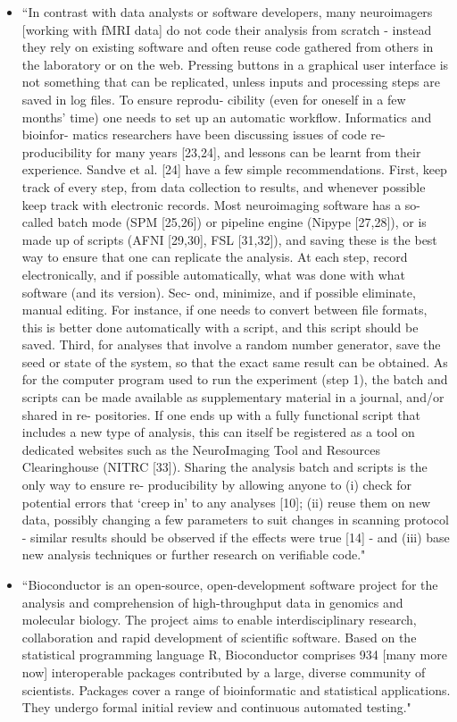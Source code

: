 \documentclass[pdftex,english,11pt,parskip=half]{scrartcl}
\begin{document}
\begin{itemize}
\item ``In contrast with data analysts or software developers, many neuroimagers [working with fMRI data] do not code their analysis from scratch - instead they rely on existing software and often reuse code gathered from others in the laboratory or on the web. Pressing buttons in a graphical user interface is not something that can be replicated, unless inputs and processing steps are saved in log files. To ensure reprodu- cibility (even for oneself in a few months’ time) one needs to set up an automatic workflow. Informatics and bioinfor- matics researchers have been discussing issues of code re- producibility for many years [23,24], and lessons can be learnt from their experience. Sandve et al. [24] have a few simple recommendations. First, keep track of every step, from data collection to results, and whenever possible keep track with electronic records. Most neuroimaging software has a so-called batch mode (SPM [25,26]) or pipeline engine (Nipype [27,28]), or is made up of scripts (AFNI [29,30], FSL [31,32]), and saving these is the best way to ensure that one can replicate the analysis. At each step, record electronically, and if possible automatically, what was done with what software (and its version). Sec- ond, minimize, and if possible eliminate, manual editing. For instance, if one needs to convert between file formats, this is better done automatically with a script, and this script should be saved. Third, for analyses that involve a random number generator, save the seed or state of the system, so that the exact same result can be obtained. As for the computer program used to run the experiment (step 1), the batch and scripts can be made available as supplementary material in a journal, and/or shared in re- positories. If one ends up with a fully functional script that includes a new type of analysis, this can itself be registered as a tool on dedicated websites such as the NeuroImaging Tool and Resources Clearinghouse (NITRC [33]). Sharing the analysis batch and scripts is the only way to ensure re- producibility by allowing anyone to (i) check for potential errors that ‘creep in’ to any analyses [10]; (ii) reuse them on new data, possibly changing a few parameters to suit changes in scanning protocol - similar results should be observed if the effects were true [14] - and (iii) base new analysis techniques or further research on verifiable code." \cite{pernet2015improving}
\item ``Bioconductor is an open-source, open-development software project for the analysis and comprehension of high-throughput data in genomics and molecular biology. The project aims to enable interdisciplinary research, collaboration and rapid development of scientific software. Based on the statistical programming language R, Bioconductor comprises 934 [many more now] interoperable packages contributed by a large, diverse community of scientists. Packages cover a range of bioinformatic and statistical applications. They undergo formal initial review and continuous automated testing." \cite{huber2015orchestrating}

\end{itemize}
\end{document}
